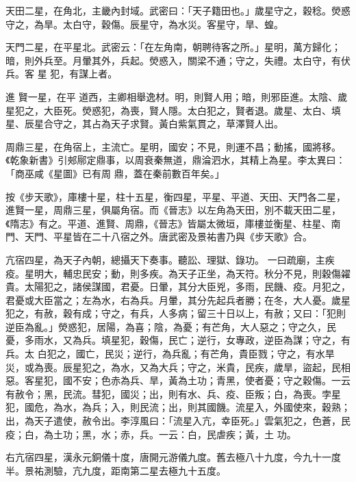 \begin{pinyinscope}
 天田二星，在角北，主畿內封域。武密曰：「天子籍田也。」歲星守之，穀稔。熒惑
 守之，為旱。太白守，穀傷。辰星守，為水災。客星守，旱、蝗。



 天門二星，在平星北。武密云：「在左角南，朝聘待客之所。」星明，萬方歸化；暗，則外兵至。月暈其外，兵起。熒惑入，關梁不通；守之，失禮。太白守，有伏兵。客
 星
 犯，有謀上者。



 進
 賢一星，在平
 道西，主卿相舉逸材。明，則賢人用；暗，則邪臣進。太陰、歲星犯之，大臣死。熒惑犯，為喪，賢人隱。太白犯之，賢者退。歲星、太白、填星、辰星合守之，其占為天子求賢。黃白紫氣貫之，草澤賢人出。



 周鼎三星，在角宿上，主流亡。星明，國安；不見，則運不昌；動搖，國將移。《乾象新書》引郟鄏定鼎事，以周衰秦無道，鼎淪泗水，其精上為星。李太異曰：「商巫咸《星圖》已有周
 鼎，蓋在秦前數百年矣。」



 按《步天歌》，庫樓十星，柱十五星，衡四星，平星、平道、天田、天門各二星，進賢一星，周鼎三星，俱屬角宿。而《晉志》以左角為天田，別不載天田二星，《隋志》有之。平道、進賢、周鼎，《晉志》皆屬太微垣，庫樓並衡星、柱星、南門、天門、平星皆在二十八宿之外。唐武密及景祐書乃與《步天歌》合。



 亢宿四星，為天子內朝，總攝天下奏事。聽訟、理獄、錄功。
 一曰疏廟，主疾疫。星明大，輔忠民安；動，則多疾。為天子正坐，為天符。秋分不見，則穀傷糴貴。太陽犯之，諸侯謀國，君憂。日暈，其分大臣兇，多雨，民饑、疫。月犯之，君憂或大臣當之；左為水，右為兵。月暈，其分先起兵者勝；在冬，大人憂。歲星犯之，有赦，穀有成；守之，有兵，人多病；留三十日以上，有赦；又曰：「犯則逆臣為亂。」熒惑犯，居陽，為喜；陰，為憂；有芒角，大人惡之；守之久，民憂，多雨水，又為兵。填星犯，穀傷，民亡；逆行，女專政，逆臣為謀；守之，有兵。太
 白犯之，國亡，民災；逆行，為兵亂；有芒角，貴臣戮；守之，有水旱災，或為喪。辰星犯之，為水，又為大兵；守之，米貴，民疾，歲旱，盜起，民相惡。客星犯，國不安；色赤為兵、旱，黃為土功；青黑，使者憂；守之穀傷。一云有赦令；黑，民流。彗犯，國災；出，則有水、兵、疫、臣叛；白，為喪。孛星犯，國危，為水，為兵；入，則民流；出，則其國饑。流星入，外國使來，穀熟；出，為天子遣使，赦令出。李淳風曰：「流星入亢，幸臣死。」雲氣犯之，色蒼，民疫；白，為土功；黑，水；赤，兵。一云：白，民虐疾；黃，土
 功。



 右亢宿四星，漢永元銅儀十度，唐開元游儀九度。舊去極八十九度，今九十一度半。景祐測驗，亢九度，距南第二星去極九十五度。




\end{pinyinscope}
